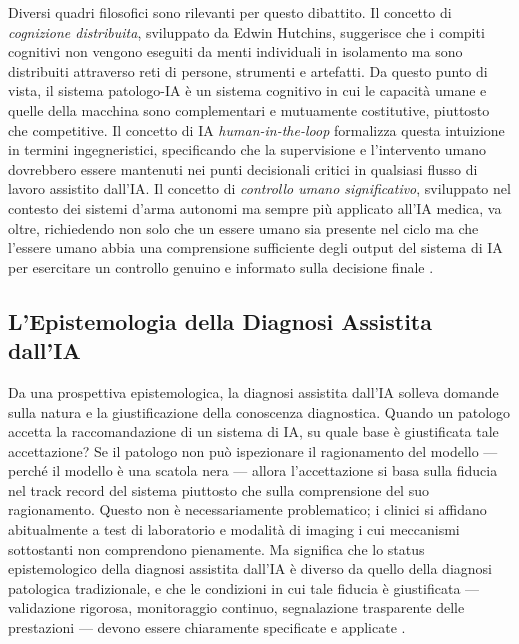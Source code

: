 Diversi quadri filosofici sono rilevanti per questo dibattito. Il concetto di \emph{cognizione distribuita}, sviluppato da Edwin Hutchins, suggerisce che i compiti cognitivi non vengono eseguiti da menti individuali in isolamento ma sono distribuiti attraverso reti di persone, strumenti e artefatti. Da questo punto di vista, il sistema patologo-IA è un sistema cognitivo in cui le capacità umane e quelle della macchina sono complementari e mutuamente costitutive, piuttosto che competitive. Il concetto di IA \emph{human-in-the-loop} formalizza questa intuizione in termini ingegneristici, specificando che la supervisione e l'intervento umano dovrebbero essere mantenuti nei punti decisionali critici in qualsiasi flusso di lavoro assistito dall'IA. Il concetto di \emph{controllo umano significativo}, sviluppato nel contesto dei sistemi d'arma autonomi ma sempre più applicato all'IA medica, va oltre, richiedendo non solo che un essere umano sia presente nel ciclo ma che l'essere umano abbia una comprensione sufficiente degli output del sistema di IA per esercitare un controllo genuino e informato sulla decisione finale \cite{zhang2023}.

\subsection{L'Epistemologia della Diagnosi Assistita dall'IA}

Da una prospettiva epistemologica, la diagnosi assistita dall'IA solleva domande sulla natura e la giustificazione della conoscenza diagnostica. Quando un patologo accetta la raccomandazione di un sistema di IA, su quale base è giustificata tale accettazione? Se il patologo non può ispezionare il ragionamento del modello — perché il modello è una scatola nera — allora l'accettazione si basa sulla fiducia nel track record del sistema piuttosto che sulla comprensione del suo ragionamento. Questo non è necessariamente problematico; i clinici si affidano abitualmente a test di laboratorio e modalità di imaging i cui meccanismi sottostanti non comprendono pienamente. Ma significa che lo status epistemologico della diagnosi assistita dall'IA è diverso da quello della diagnosi patologica tradizionale, e che le condizioni in cui tale fiducia è giustificata — validazione rigorosa, monitoraggio continuo, segnalazione trasparente delle prestazioni — devono essere chiaramente specificate e applicate \cite{cruzirivera2020}.

